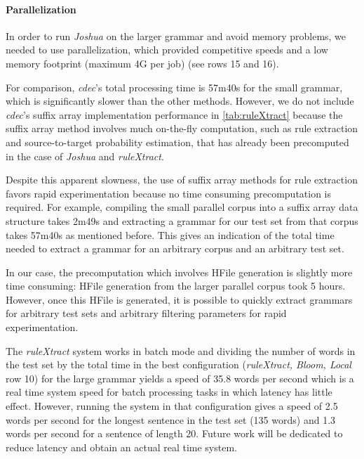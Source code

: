\paragraph{Parallelization} In order to run \emph{Joshua} on the larger grammar and
    avoid memory problems, we needed to use parallelization, which provided
    competitive speeds and a low memory footprint (maximum 4G per job) (see rows
    15 and 16).

For comparison, \emph{cdec}'s total processing time is 57m40s for the small
grammar, which is significantly slower than the other methods. However, we do
not include \emph{cdec}'s suffix array implementation performance in
\autoref{tab:ruleXtract}
because the suffix array method involves much on-the-fly computation, such
as rule extraction and source-to-target probability estimation, that has
already been precomputed in the case of \emph{Joshua} and \emph{ruleXtract}.

Despite this apparent slowness, the use of suffix array methods for rule extraction
favors rapid experimentation because no time consuming precomputation is required.
For example, compiling the small parallel corpus into a suffix array
data structure takes 2m49s and extracting a grammar for our test set from
that corpus takes 57m40s as mentioned before. This gives an indication of the total
time needed to extract a grammar for an arbitrary corpus and an arbitrary test
set.

In our case, the precomputation which involves HFile generation is slightly more
time consuming: HFile generation from the larger parallel corpus took 5 hours.
However, once this HFile is generated, it is possible to quickly extract grammars
for arbitrary test sets and arbitrary filtering parameters for rapid
experimentation.

The \emph{ruleXtract} system works in batch mode and dividing the number of
words in the test set by the total time in the best configuration
(\emph{ruleXtract, Bloom, Local} row 10) for the large grammar yields
a speed of 35.8
words per second which is a real time system speed for batch processing tasks in
which latency has little effect. However, running the system in that
configuration gives a speed of 2.5 words per second for the longest sentence in
the test set (135 words) and 1.3 words per second for a sentence of length 20.
Future work will be dedicated to reduce latency and obtain an actual real time
system.

